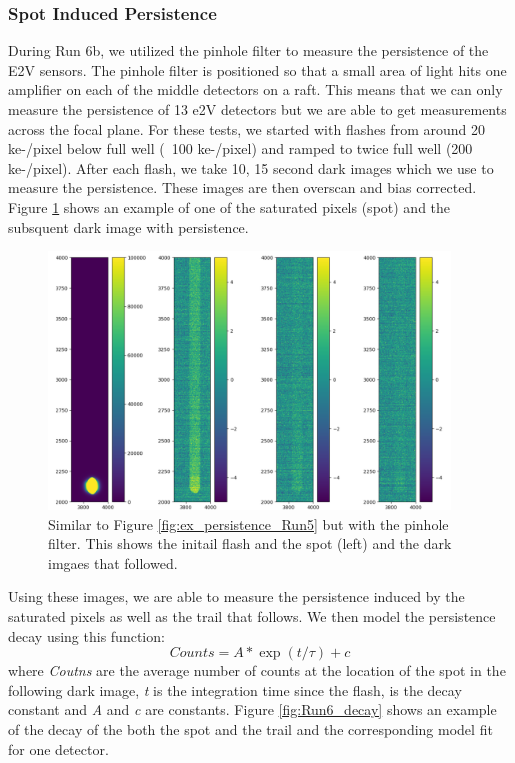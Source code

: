 \documentclass[DM,authoryear,toc]{lsstdoc}
\begin{document}
\subsubsection{Spot Induced Persistence}
During Run 6b, we utilized the pinhole filter to measure the persistence of the E2V sensors.
The pinhole filter is positioned so that a small area of light hits one amplifier on each of the middle detectors on a raft.
This means that we can only measure the persistence of 13 e2V detectors but we are able to get measurements across the focal plane.
For these tests, we started with flashes from around 20 ke-/pixel below full well (~100 ke-/pixel) and ramped to twice full well (200 ke-/pixel).
After each flash, we take 10, 15 second dark images which we use to measure the persistence.
These images are then overscan and bias corrected.
Figure \ref{fig:Run6_example} shows an example of one of the saturated pixels (spot) and the subsquent dark image with persistence.

\begin{figure}[!htp]
  \centering
  \includegraphics[width=0.95\textwidth, angle=0]{Run6_ex.png}
  \caption{
  Similar to Figure \ref{fig:ex_persistence_Run5} but with the pinhole filter. 
  This shows the initail flash and the spot (left) and the dark imgaes that followed.
  }\label{fig:Run6_example}
\end{figure}


Using these images, we are able to measure the persistence induced by the saturated pixels as well as the trail that follows.
We then model the persistence decay using this function:
\begin{equation*}
  Counts= A * \exp(t/\tau)+c
\end{equation*}
where \textit{Coutns} are the average number of counts at the location of the spot in the following dark image, \textit{t} is the integration time since the flash, \textit{\tau} is the decay constant and \textit{A} and \textit{c} are constants.
Figure \ref{fig:Run6_decay} shows an example of the decay of the both the spot and the trail and the corresponding model fit for one detector.
\end{document}

